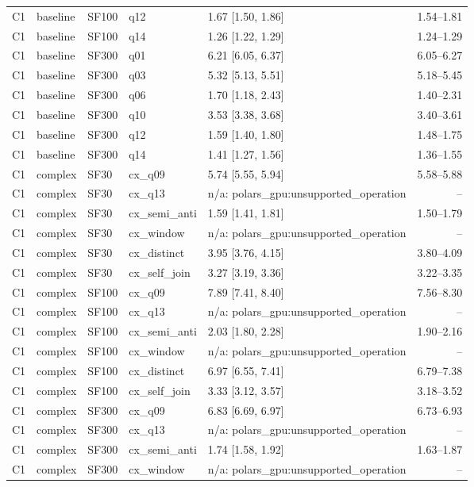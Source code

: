 \begin{longtable}{lllllr}
C1 & baseline & SF100 & q12 & 1.67 [1.50, 1.86] & 1.54--1.81 \\
C1 & baseline & SF100 & q14 & 1.26 [1.22, 1.29] & 1.24--1.29 \\
C1 & baseline & SF300 & q01 & 6.21 [6.05, 6.37] & 6.05--6.27 \\
C1 & baseline & SF300 & q03 & 5.32 [5.13, 5.51] & 5.18--5.45 \\
C1 & baseline & SF300 & q06 & 1.70 [1.18, 2.43] & 1.40--2.31 \\
C1 & baseline & SF300 & q10 & 3.53 [3.38, 3.68] & 3.40--3.61 \\
C1 & baseline & SF300 & q12 & 1.59 [1.40, 1.80] & 1.48--1.75 \\
C1 & baseline & SF300 & q14 & 1.41 [1.27, 1.56] & 1.36--1.55 \\
C1 & complex & SF30 & cx\_q09 & 5.74 [5.55, 5.94] & 5.58--5.88 \\
C1 & complex & SF30 & cx\_q13 & n/a: polars\_gpu:unsupported\_operation & -- \\
C1 & complex & SF30 & cx\_semi\_anti & 1.59 [1.41, 1.81] & 1.50--1.79 \\
C1 & complex & SF30 & cx\_window & n/a: polars\_gpu:unsupported\_operation & -- \\
C1 & complex & SF30 & cx\_distinct & 3.95 [3.76, 4.15] & 3.80--4.09 \\
C1 & complex & SF30 & cx\_self\_join & 3.27 [3.19, 3.36] & 3.22--3.35 \\
C1 & complex & SF100 & cx\_q09 & 7.89 [7.41, 8.40] & 7.56--8.30 \\
C1 & complex & SF100 & cx\_q13 & n/a: polars\_gpu:unsupported\_operation & -- \\
C1 & complex & SF100 & cx\_semi\_anti & 2.03 [1.80, 2.28] & 1.90--2.16 \\
C1 & complex & SF100 & cx\_window & n/a: polars\_gpu:unsupported\_operation & -- \\
C1 & complex & SF100 & cx\_distinct & 6.97 [6.55, 7.41] & 6.79--7.38 \\
C1 & complex & SF100 & cx\_self\_join & 3.33 [3.12, 3.57] & 3.18--3.52 \\
C1 & complex & SF300 & cx\_q09 & 6.83 [6.69, 6.97] & 6.73--6.93 \\
C1 & complex & SF300 & cx\_q13 & n/a: polars\_gpu:unsupported\_operation & -- \\
C1 & complex & SF300 & cx\_semi\_anti & 1.74 [1.58, 1.92] & 1.63--1.87 \\
C1 & complex & SF300 & cx\_window & n/a: polars\_gpu:unsupported\_operation & -- \\

\end{longtable}
